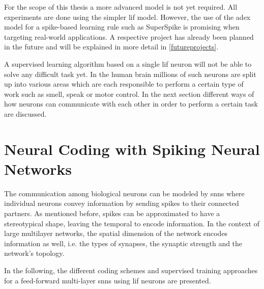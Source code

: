For the scope of this thesis a more advanced model is not yet required. All experiments are done using the simpler \gls{lif} model. However, the use of the \gls{adex} model for a spike-based learning rule such as SuperSpike is promising when targeting real-world applications. A respective project has already been planned in the future and will be explained in more detail in \cref{futureprojects}.

A supervised learning algorithm based on a single \gls{lif} neuron will not be able to solve any difficult task yet. In the human brain millions of such neurons are split up into various areas which are each responsible to perform a certain type of work such as smell, speak or motor control. In the next section different ways of how neurons can communicate with each other in order to perform a certain task are discussed.

\section{Neural Coding with Spiking Neural Networks}
\label{neuralcoding}
The communication among biological neurons can be modeled by \glspl{snn} where individual neurons convey information by sending spikes to their connected partners. As mentioned before, spikes can be approximated to have a stereotypical shape, leaving the temporal to encode information. In the context of large multilayer networks, the spatial dimension of the network encodes information as well, i.e. the types of synapses, the synaptic strength and the network's topology.


In the following, the different coding schemes and supervised training approaches for a feed-forward multi-layer \glspl{snn} using \gls{lif} neurons are presented.

